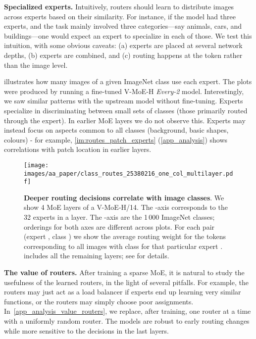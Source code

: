 \documentclass{article}
\newcommand{\abbv}{{V-MoE}}
\begin{document}
\textbf{Specialized experts.}
Intuitively, routers should learn to distribute images across experts based on their similarity.
For instance, if the model had three experts, and the task mainly involved three categories---say animals, cars, and buildings---one would expect an expert to specialize in each of those.
We test this intuition, with some obvious caveats: (a) experts are placed at several network depths, (b)  experts are combined, and (c) routing happens at the token rather than the image level.

 illustrates how many images of a given ImageNet class use each expert. The plots were produced by running a fine-tuned \abbv{}-H \emph{Every-2} model. Interestingly, we saw similar
patterns with the upstream model without fine-tuning.
Experts specialize in discriminating between small sets of classes (those primarily routed through the expert).
In earlier MoE layers we do not observe this. Experts may instead focus on aspects common to all classes (background, basic shapes, colours) - for example, \cref{im:routes_patch_experts} (\cref{app_analysis}) shows correlations with patch location in earlier layers.

\begin{figure}[tb]
\centering
\texttt{[image: images/aa\_paper/class\_routes\_25380216\_one\_col\_multilayer.pdf]}
\caption{\textbf{Deeper routing decisions correlate with image classes}.
We show 4 MoE layers of a \abbv{}-H/14. The -axis corresponds to the 32 experts in a layer. The -axis are the 1\,000 ImageNet classes; orderings for both axes are different across plots.
For each pair (expert , class ) we show the average routing weight for the tokens corresponding to all images with class  for that particular expert .  includes all the remaining layers; see  for details.}
\label{im:routes_class_experts}
\end{figure}

\textbf{The value of routers.}
After training a sparse MoE, it is natural to study the usefulness of the learned routers, in the light of several pitfalls.
For example, the routers may just act as a load balancer if experts end up learning very similar functions, or the routers may simply choose poor assignments.
In~\cref{app_analysis_value_routers}, we replace, after training, one router at a time with a uniformly random router.
The models are robust to early routing changes while more sensitive to the decisions in the last layers.
\end{document}
